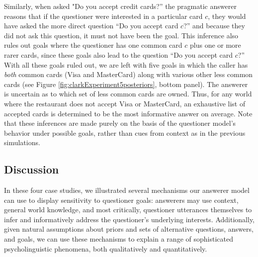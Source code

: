 \documentclass[12pt, floatsintext, jou]{apa6}
\begin{document}
Similarly, when asked "Do you accept credit cards?'' the pragmatic answerer reasons that if the questioner were interested in a particular card $c$, they would have asked the more direct question ``Do you accept card $c$?'' and because they did not ask this question, it must not have been the goal. This inference also rules out goals where the questioner has one common card $c$ plus one or more rarer cards, since these goals also lead to the question ``Do you accept card $c$?'' With all these goals ruled out, we are left with five goals in which the caller has \emph{both} common cards (Visa and MasterCard) along with various other less common cards (see Figure \ref{fig:clarkExperiment5posteriors}, bottom panel). The answerer is uncertain as to which set of less common cards are owned. Thus, for any world where the restaurant does not accept Visa or MasterCard, an exhaustive list of accepted cards is determined to be the most informative answer on average. Note that these inferences are made purely on the basis of the questioner model's behavior under possible goals, rather than cues from context as in the previous simulations.

\subsection{Discussion}

In these four case studies, we illustrated several mechanisms our answerer model can use to display sensitivity to questioner goals: answerers may use context, general world knowledge, and most critically, questioner utterances themselves to infer and informatively address the questioner's underlying interests. Additionally, given natural assumptions about priors and sets of alternative questions, answers, and goals, we can use these mechanisms to explain a range of sophisticated psycholinguistic phenomena, both qualitatively and quantitatively.


\end{document}
